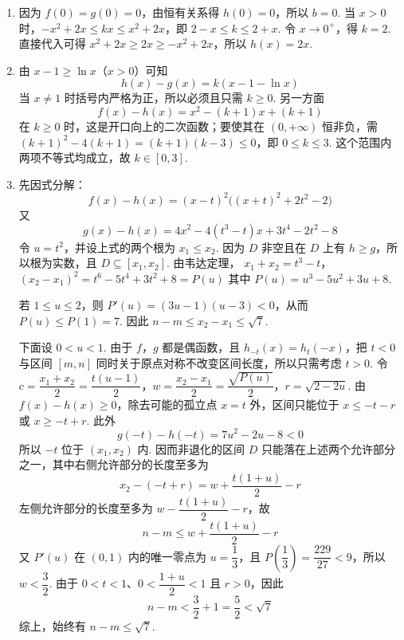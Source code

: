 \begin{solution}
\begin{enumerate}
\item 因为 \(f(0)=g(0)=0\)，由恒有关系得 \(h(0)=0\)，所以 \(b=0\). 当 \(x>0\) 时，\(-x^2+2x\leq kx\leq x^2+2x\)，即 \(2-x\leq k\leq2+x\). 令 \(x\to0^+\)，得 \(k=2\). 直接代入可得 \(x^2+2x\geq2x\geq-x^2+2x\)，所以 \(h(x)=2x\).
\item 由 \(x-1\geq\ln x\)（\(x>0\)）可知
\[
h(x)-g(x)=k(x-1-\ln x)
\]
当 \(x\ne1\) 时括号内严格为正，所以必须且只需 \(k\geq0\). 另一方面
\[
f(x)-h(x)=x^2-(k+1)x+(k+1)
\]
在 \(k\geq0\) 时，这是开口向上的二次函数；要使其在 \((0,+\infty)\) 恒非负，需 \((k+1)^2-4(k+1)=(k+1)(k-3)\leq0\)，即 \(0\leq k\leq3\). 这个范围内两项不等式均成立，故 \(k\in[0,3]\).
\item 先因式分解：
\[
f(x)-h(x)=(x-t)^2\bigl((x+t)^2+2t^2-2\bigr)
\]
又
\[
g(x)-h(x)=4x^2-4(t^3-t)x+3t^4-2t^2-8
\]
令 \(u=t^2\)，并设上式的两个根为 \(x_1\leq x_2\). 因为 \(D\) 非空且在 \(D\) 上有 \(h\geq g\)，所以根为实数，且 \(D\subseteq[x_1,x_2]\). 由韦达定理，
\(x_1+x_2=t^3-t\)，\((x_2-x_1)^2=t^6-5t^4+3t^2+8=P(u)\)
其中 \(P(u)=u^3-5u^2+3u+8\).

若 \(1\leq u\leq2\)，则 \(P'(u)=(3u-1)(u-3)<0\)，从而 \(P(u)\leq P(1)=7\). 因此 \(n-m\leq x_2-x_1\leq\sqrt7\).

下面设 \(0<u<1\). 由于 \(f\)，\(g\) 都是偶函数，且 \(h_{-t}(x)=h_t(-x)\)，把 \(t<0\) 与区间 \([m,n]\) 同时关于原点对称不改变区间长度，所以只需考虑 \(t>0\). 令
\(c=\dfrac{x_1+x_2}{2}=\dfrac{t(u-1)}2\)，\(w=\dfrac{x_2-x_1}{2}=\dfrac{\sqrt{P(u)}}2\)，\(r=\sqrt{2-2u}\).
由 \(f(x)-h(x)\geq0\)，除去可能的孤立点 \(x=t\) 外，区间只能位于 \(x\leq-t-r\) 或 \(x\geq-t+r\). 此外
\[
g(-t)-h(-t)=7u^2-2u-8<0
\]
所以 \(-t\) 位于 \((x_1,x_2)\) 内. 因而非退化的区间 \(D\) 只能落在上述两个允许部分之一，其中右侧允许部分的长度至多为
\[
x_2-(-t+r)=w+\dfrac{t(1+u)}2-r
\]
左侧允许部分的长度至多为 \(w-\dfrac{t(1+u)}2-r\)，故
\[
n-m\leq w+\dfrac{t(1+u)}2-r
\]
又 \(P'(u)\) 在 \((0,1)\) 内的唯一零点为 \(u=\dfrac13\)，且 \(P\left(\dfrac13\right)=\dfrac{229}{27}<9\)，所以 \(w<\dfrac32\). 由于 \(0<t<1\)、\(0<\dfrac{1+u}{2}<1\) 且 \(r>0\)，因此
\[
n-m<\dfrac32+1=\dfrac52<\sqrt7
\]
综上，始终有 \(n-m\leq\sqrt7\).
\end{enumerate}
\end{solution}


